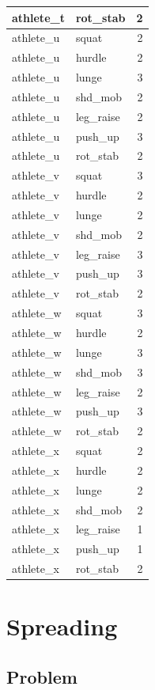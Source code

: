 \documentclass[
]{book}
\begin{document}
\begin{tabular}{l|l|r}
\hline
athlete\_t & rot\_stab & 2\\
\hline
athlete\_u & squat & 2\\
\hline
athlete\_u & hurdle & 2\\
\hline
athlete\_u & lunge & 3\\
\hline
athlete\_u & shd\_mob & 2\\
\hline
athlete\_u & leg\_raise & 2\\
\hline
athlete\_u & push\_up & 3\\
\hline
athlete\_u & rot\_stab & 2\\
\hline
athlete\_v & squat & 3\\
\hline
athlete\_v & hurdle & 2\\
\hline
athlete\_v & lunge & 2\\
\hline
athlete\_v & shd\_mob & 2\\
\hline
athlete\_v & leg\_raise & 3\\
\hline
athlete\_v & push\_up & 3\\
\hline
athlete\_v & rot\_stab & 2\\
\hline
athlete\_w & squat & 3\\
\hline
athlete\_w & hurdle & 2\\
\hline
athlete\_w & lunge & 3\\
\hline
athlete\_w & shd\_mob & 3\\
\hline
athlete\_w & leg\_raise & 2\\
\hline
athlete\_w & push\_up & 3\\
\hline
athlete\_w & rot\_stab & 2\\
\hline
athlete\_x & squat & 2\\
\hline
athlete\_x & hurdle & 2\\
\hline
athlete\_x & lunge & 2\\
\hline
athlete\_x & shd\_mob & 2\\
\hline
athlete\_x & leg\_raise & 1\\
\hline
athlete\_x & push\_up & 1\\
\hline
athlete\_x & rot\_stab & 2\\
\hline
\end{tabular}

\hypertarget{WRANGLE-SPREAD}{%
\section{Spreading}\label{WRANGLE-SPREAD}}

\hypertarget{problem-6}{%
\subsection{Problem}\label{problem-6}}
\end{document}
